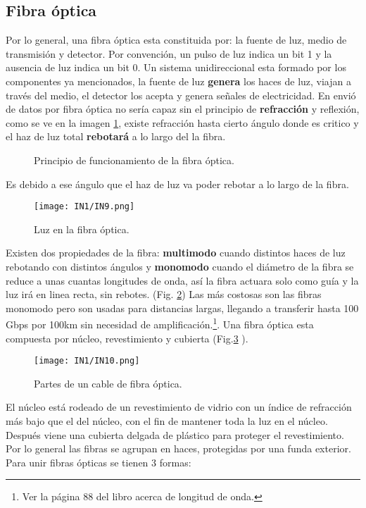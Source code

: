 \documentclass[
	12pt, %
	fleqn, %
	a4paper, %
	oneside, %
]{LegrandOrangeBook}
\begin{document}
\subsection{Fibra óptica}
Por lo general, una fibra óptica esta constituida por: la fuente de luz, medio de transmisión y detector. Por convención, un pulso de luz indica un bit 1 y la ausencia de luz indica un bit 0. Un sistema unidireccional esta formado por los componentes ya mencionados, la fuente de luz \textbf{genera} los haces de luz, viajan a través del medio, el detector los acepta y genera señales  de electricidad. En envió de datos por fibra óptica no sería capaz sin el principio de \textbf{refracción} y reflexión, como se ve en la imagen \ref{fig:fibra optica funcionamiento}, existe refracción hasta cierto ángulo donde es critico y el haz de luz total \textbf{rebotará} a lo largo del la fibra.
\begin{figure}[H]
\centering
{}
\caption{Principio de funcionamiento de la fibra óptica.}
\label{fig:fibra optica funcionamiento}
\end{figure}
Es debido a ese ángulo que el haz de luz va poder rebotar a lo largo de la fibra. \begin{figure}[]
\centering
\texttt{[image: IN1/IN9.png]}
\caption{Luz en la fibra óptica.}
\label{fig:modos en la fibra}
\end{figure}
Existen dos propiedades de la fibra: \textbf{multimodo} cuando distintos haces de luz rebotando con distintos ángulos y \textbf{monomodo} cuando el diámetro de la fibra se reduce a unas cuantas longitudes de onda, así la fibra actuara solo como guía y la luz irá en linea recta, sin rebotes. (Fig. \ref{fig:modos en la fibra}) Las más costosas son las fibras monomodo pero son usadas para distancias largas, llegando a transferir hasta 100 Gbps por 100km sin necesidad de amplificación.\footnote{Ver la página 88 del libro \cite{tanenbaum2012computer} acerca de longitud de onda.}. Una fibra óptica esta compuesta por núcleo, revestimiento y cubierta (Fig.\ref{fig:partes fibra} ).
\begin{figure}[]
\centering
\texttt{[image: IN1/IN10.png]}
\caption{Partes de un cable de fibra óptica.}
\label{fig:partes fibra}
\end{figure}
El núcleo está rodeado de un revestimiento de vidrio con un índice de refracción más bajo que el del núcleo, con el fin de mantener toda la luz en el núcleo. Después viene una cubierta delgada de plástico para proteger el revestimiento. Por lo general las fibras se agrupan en haces, protegidas por una funda exterior. Para unir fibras ópticas se tienen 3 formas:
\end{document}
